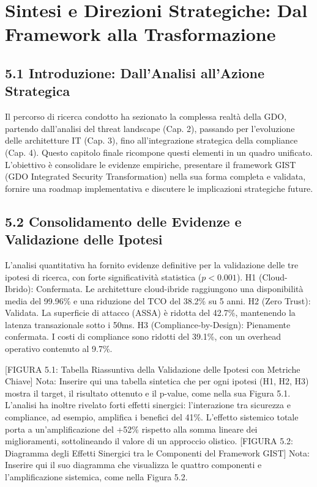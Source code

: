 \chapter{Sintesi e Direzioni Strategiche: Dal Framework alla Trasformazione}
\section{5.1 Introduzione: Dall'Analisi all'Azione Strategica}

Il percorso di ricerca condotto ha sezionato la complessa realtà della GDO, partendo dall'analisi del threat landscape (Cap. 2), passando per l'evoluzione delle architetture IT (Cap. 3), fino all'integrazione strategica della compliance (Cap. 4). Questo capitolo finale ricompone questi elementi in un quadro unificato. L'obiettivo è consolidare le evidenze empiriche, presentare il framework GIST (GDO Integrated Security Transformation) nella sua forma completa e validata, fornire una roadmap implementativa e discutere le implicazioni strategiche future.

\section{5.2 Consolidamento delle Evidenze e Validazione delle Ipotesi}

L'analisi quantitativa ha fornito evidenze definitive per la validazione delle tre ipotesi di ricerca, con forte significatività statistica ($p<0.001$).
H1 (Cloud-Ibrido): Confermata. Le architetture cloud-ibride raggiungono una disponibilità media del 99.96\% e una riduzione del TCO del 38.2\% su 5 anni.
H2 (Zero Trust): Validata. La superficie di attacco (ASSA) è ridotta del 42.7\%, mantenendo la latenza transazionale sotto i 50ms.
H3 (Compliance-by-Design): Pienamente confermata. I costi di compliance sono ridotti del 39.1\%, con un overhead operativo contenuto al 9.7\%.


[FIGURA 5.1: Tabella Riassuntiva della Validazione delle Ipotesi con Metriche Chiave]
Nota: Inserire qui una tabella sintetica che per ogni ipotesi (H1, H2, H3) mostra il target, il risultato ottenuto e il p-value, come nella sua Figura 5.1.
L'analisi ha inoltre rivelato forti effetti sinergici: l'interazione tra sicurezza e compliance, ad esempio, amplifica i benefici del 41\%. L'effetto sistemico totale porta a un'amplificazione del +52\% rispetto alla somma lineare dei miglioramenti, sottolineando il valore di un approccio olistico.
[FIGURA 5.2: Diagramma degli Effetti Sinergici tra le Componenti del Framework GIST]
Nota: Inserire qui il suo diagramma che visualizza le quattro componenti e l'amplificazione sistemica, come nella Figura 5.2.


